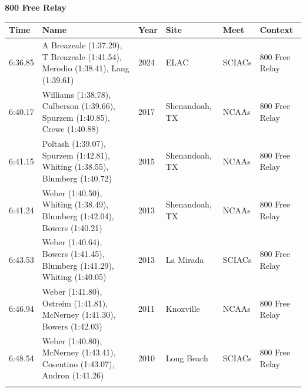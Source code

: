 \noindent\begin{minipage}[t]{0.98\textwidth}
\centering
\textbf{\textcolor{teamprimary}{800 Free Relay}}\par
\vspace{0.5em}
\centering
\small
\renewcommand{\arraystretch}{1.0}
\setlength{\tabcolsep}{4pt}
\begin{tabular}{@{}p{2.0cm}p{3.2cm}p{1.2cm}p{2.0cm}p{2.0cm}p{2.5cm}@{}}
\toprule
\textbf{Time} & \textbf{Name} & \textbf{Year} & \textbf{Site} & \textbf{Meet} & \textbf{Context} \\
\midrule
6:36.85 & A Breazeale (1:37.29), T Breazeale (1:41.54), Merodio (1:38.41), Lang (1:39.61) & 2024 & ELAC & SCIACs & 800 Free Relay \\
6:40.17 & Williams (1:38.78), Culberson (1:39.66), Spurzem (1:40.85), Crewe (1:40.88) & 2017 & Shenandoah, TX & NCAAs & 800 Free Relay \\
6:41.15 & Poltash (1:39.07), Spurzem (1:42.81), Whiting (1:38.55), Blumberg (1:40.72) & 2015 & Shenandoah, TX & NCAAs & 800 Free Relay \\
6:41.24 & Weber (1:40.50), Whiting (1:38.49), Blumberg (1:42.04), Bowers (1:40.21) & 2013 & Shenandoah, TX & NCAAs & 800 Free Relay \\
6:43.53 & Weber (1:40.64), Bowers (1:41.45), Blumberg (1:41.29), Whiting (1:40.05) & 2013 & La Mirada & SCIACs & 800 Free Relay \\
6:46.94 & Weber (1:41.80), Ostreim (1:41.81), McNerney (1:41.30), Bowers (1:42.03) & 2011 & Knoxville & NCAAs & 800 Free Relay \\
6:48.54 & Weber (1:40.80), McNerney (1:43.41), Cosentino (1:43.07), Andron (1:41.26) & 2010 & Long Beach & SCIACs & 800 Free Relay \\
\bottomrule
\vspace{0.5em}
\end{tabular}
\end{minipage}
\vspace{1.2em}
